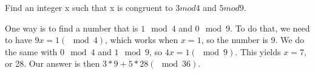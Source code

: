 \question Find an integer x such that x is congruent to $3 mod 4$ and $5 mod 9$.
\begin{solution}[1 in]
One way is to find a number that is $1 \mod 4$ and $0 \mod 9$. \newline
To do that, we need to have $9x = 1 (\mod 4)$, which works when $x = 1$, so the number is 9. \newline
We do the same with $0 \mod 4$ and $1 \mod 9$, so $4x = 1 (\mod 9)$. This yields $x = 7$, or 28. \newline
Our answer is then $3 * 9 + 5 * 28 (\mod 36)$.
\end{solution}

